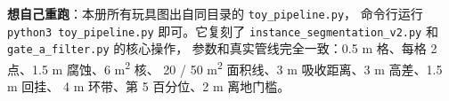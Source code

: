 \documentclass[11pt]{ctexart}
\begin{document}
\bigskip
\noindent\textbf{想自己重跑}：本册所有玩具图出自同目录的 \texttt{toy\_pipeline.py}，
命令行运行 \texttt{python3 toy\_pipeline.py} 即可。它复刻了
\texttt{instance\_segmentation\_v2.py} 和 \texttt{gate\_a\_filter.py} 的核心操作，
参数和真实管线完全一致：0.5 m 格、每格 2 点、1.5 m 腐蚀、6 m\textsuperscript{2} 核、
20 / 50 m\textsuperscript{2} 面积线、3 m 吸收距离、3 m 高差、1.5 m 回挂、
4 m 环带、第 5 百分位、2 m 离地门槛。
\end{document}
